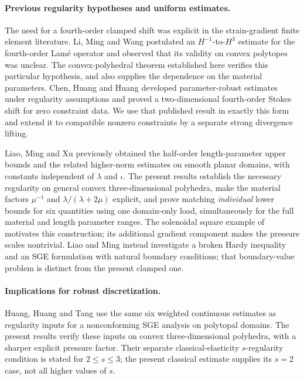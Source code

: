 \documentclass[11pt,a4paper]{article}
\theoremstyle{remark}
\numberwithin{equation}{section}
\begin{document}
\paragraph{Previous regularity hypotheses and uniform estimates.}
The need for a fourth-order clamped shift was explicit in the strain-gradient
finite element literature. Li, Ming and Wang \cite[Hypothesis~1]{LiMingWang2021}
postulated an $H^{-1}$-to-$H^3$ estimate for the fourth-order Lam\'e
operator and observed that its validity on convex polytopes was unclear.
The convex-polyhedral theorem established here verifies this particular
hypothesis, and also supplies the dependence on the material parameters.
Chen, Huang and Huang \cite{CHH2023} developed parameter-robust estimates
under regularity assumptions and proved a two-dimensional fourth-order
Stokes shift for zero constraint data. We use that published result in
exactly this form and extend it to compatible nonzero constraints by a
separate strong divergence lifting.

Liao, Ming and Xu \cite[Theorem~2.9]{LiaoMingXu2023} previously obtained
the half-order length-parameter upper bounds and the related higher-norm
estimates on smooth planar domains, with constants independent of
$\lambda$ and $\iota$. The present results establish the necessary
regularity on general convex three-dimensional polyhedra, make the material factors
$\mu^{-1}$ and $\lambda/(\lambda+2\mu)$ explicit, and prove matching
\emph{individual} lower bounds for six quantities using one domain-only
load, simultaneously for the full material and length parameter ranges.
The solenoidal square example of \cite{CHH2023} motivates this construction;
its additional gradient component makes the pressure scales nontrivial.
Liao and Ming \cite{LiaoMing2025} instead investigate a broken Hardy
inequality and an SGE formulation with natural boundary conditions; that
boundary-value problem is distinct from the present clamped one.

\paragraph{Implications for robust discretization.}
Huang, Huang and Tang \cite[Section~2.3, (2.7)--(2.8)]{HuangHuangTang2026}
use the same six weighted continuous estimates as regularity inputs for
a nonconforming SGE analysis on polytopal domains. The present results
verify these inputs on convex three-dimensional polyhedra, with a
sharper explicit pressure factor. Their separate classical-elasticity
$s$-regularity condition is stated for $2\le s\le3$; the present
classical estimate supplies its $s=2$ case, not all higher values of $s$.
\end{document}
